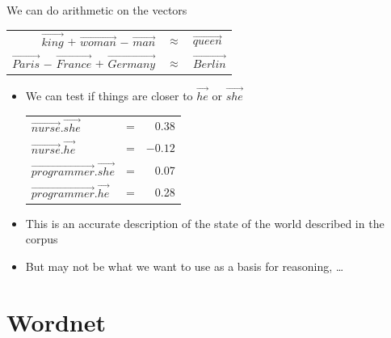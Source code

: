\documentclass[a4paper,landscape,headrule,footrule,xetex]{foils}
\begin{document}
We can do arithmetic on the vectors 


\begin{tabular}{rcl}
  $\vec{king}$ + $\vec{woman}$ $-$ $\vec{man}$  & $\approx$ & $\vec{queen}$ \\[2ex]
  $\vec{Paris}$ $-$ $\vec{France}$ + $\vec{Germany}$  & $\approx$ & $\vec{Berlin}$
\end{tabular}




\begin{itemize}
\item We can test if things are closer to $\vec{he}$ or $\vec{she}$
  \\[2ex]
  \begin{tabular}{lcr}
    $\vec{nurse}.\vec{she}$ & = & 0.38 \\
    $\vec{nurse}.\vec{he}$ & = & $-0.12$ \\
    $\vec{programmer}.\vec{she}$ & = & 0.07 \\
    $\vec{programmer}.\vec{he}$ & = & 0.28 \\
  \end{tabular}
\end{itemize}

\begin{itemize}
\item This is an accurate description of the state of the world described in the corpus
\item But may not be what we want to use as a basis for reasoning, \ldots
\end{itemize}



\section{Wordnet}


\end{document}

